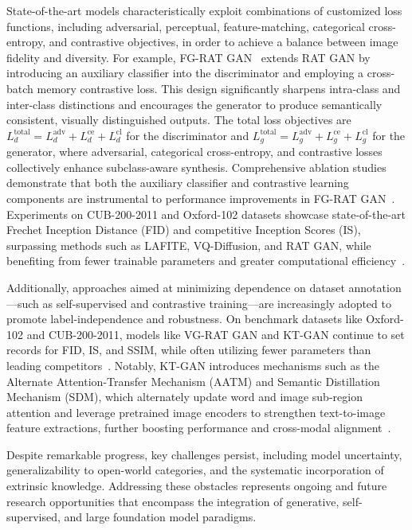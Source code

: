 \documentclass[sigconf]{acmart}
\begin{document}
State-of-the-art models characteristically exploit combinations of customized loss functions, including adversarial, perceptual, feature-matching, categorical cross-entropy, and contrastive objectives, in order to achieve a balance between image fidelity and diversity. For example, FG-RAT GAN~\cite{ref101} extends RAT GAN by introducing an auxiliary classifier into the discriminator and employing a cross-batch memory contrastive loss. This design significantly sharpens intra-class and inter-class distinctions and encourages the generator to produce semantically consistent, visually distinguished outputs. The total loss objectives are $L_d^\text{total} = L_d^\text{adv} + L_d^\text{ce} + L_d^\text{cl}$ for the discriminator and $L_g^\text{total} = L_g^\text{adv} + L_g^\text{ce} + L_g^\text{cl}$ for the generator, where adversarial, categorical cross-entropy, and contrastive losses collectively enhance subclass-aware synthesis. Comprehensive ablation studies demonstrate that both the auxiliary classifier and contrastive learning components are instrumental to performance improvements in FG-RAT GAN~\cite{ref101}. Experiments on CUB-200-2011 and Oxford-102 datasets showcase state-of-the-art Frechet Inception Distance (FID) and competitive Inception Scores (IS), surpassing methods such as LAFITE, VQ-Diffusion, and RAT GAN, while benefiting from fewer trainable parameters and greater computational efficiency~\cite{ref101}.

Additionally, approaches aimed at minimizing dependence on dataset annotation—such as self-supervised and contrastive training—are increasingly adopted to promote label-independence and robustness. On benchmark datasets like Oxford-102 and CUB-200-2011, models like VG-RAT GAN and KT-GAN continue to set records for FID, IS, and SSIM, while often utilizing fewer parameters than leading competitors~\cite{ref94,ref96,ref101}. Notably, KT-GAN introduces mechanisms such as the Alternate Attention-Transfer Mechanism (AATM) and Semantic Distillation Mechanism (SDM), which alternately update word and image sub-region attention and leverage pretrained image encoders to strengthen text-to-image feature extractions, further boosting performance and cross-modal alignment~\cite{ref94}.

Despite remarkable progress, key challenges persist, including model uncertainty, generalizability to open-world categories, and the systematic incorporation of extrinsic knowledge. Addressing these obstacles represents ongoing and future research opportunities that encompass the integration of generative, self-supervised, and large foundation model paradigms.
\end{document}

